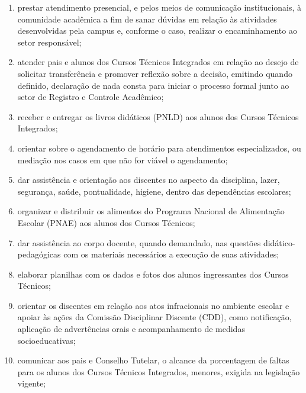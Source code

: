 \documentclass[a4paper,12pt]{report}
\begin{document}
\begin{enumerate}
\renewcommand{\labelenumi}{\Roman{enumi}}

\item prestar atendimento presencial, e pelos meios de comunicação institucionais, à 
      comunidade acadêmica a fim de sanar dúvidas em relação às atividades desenvolvidas 
      pela campus e, conforme o caso, realizar o encaminhamento ao setor responsável;

\item atender pais e alunos dos Cursos Técnicos Integrados em relação ao desejo de 
      solicitar transferência e promover reflexão sobre a decisão, emitindo quando 
      definido, declaração de nada consta para iniciar o processo formal junto ao 
      setor de Registro e Controle Acadêmico;

\item receber e entregar os livros didáticos (PNLD) aos alunos dos Cursos Técnicos 
      Integrados;

\item orientar sobre o agendamento de horário para atendimentos especializados, ou 
      mediação nos casos em que não for viável o agendamento;

\item dar assistência e orientação aos discentes no aspecto da disciplina, lazer, 
      segurança, saúde, pontualidade, higiene, dentro das dependências escolares;

\item organizar e distribuir os alimentos do Programa Nacional de Alimentação Escolar 
      (PNAE) aos alunos dos Cursos Técnicos;

\item dar assistência ao corpo docente, quando demandado, nas questões didático-pedagógicas 
      com os materiais necessários a execução de suas atividades;

\item elaborar planilhas com os dados e fotos dos alunos ingressantes dos Cursos Técnicos;

\item orientar os discentes em relação aos atos infracionais no ambiente escolar e apoiar 
      às ações da Comissão Disciplinar Discente (CDD), como notificação, aplicação de 
      advertências orais e acompanhamento de medidas socioeducativas;

\item comunicar aos pais e Conselho Tutelar, o alcance da porcentagem de faltas para os 
      alunos dos Cursos Técnicos Integrados, menores, exigida na legislação vigente;


\end{enumerate}
\end{document}
